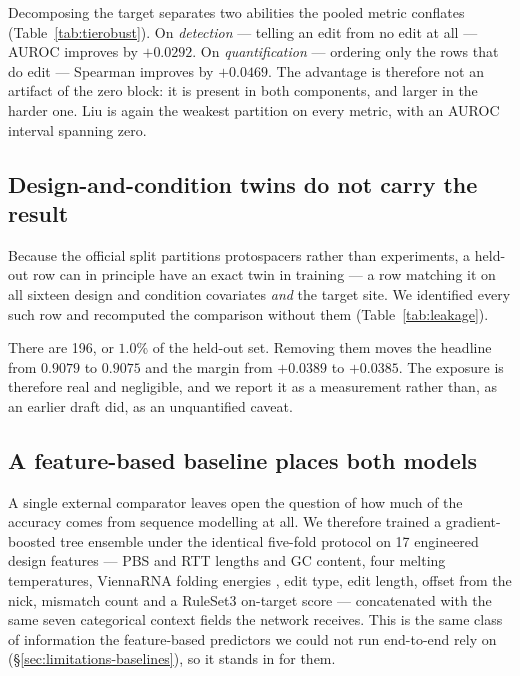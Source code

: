 \documentclass[11pt]{article}
\begin{document}
Decomposing the target separates two abilities the pooled metric conflates
(Table~\ref{tab:tierobust}). On \emph{detection} --- telling an edit from no edit at all
--- AUROC improves by $+0.0292$. On \emph{quantification} --- ordering only the rows that
do edit --- Spearman improves by $+0.0469$. The advantage is therefore not an artifact of
the zero block: it is present in both components, and larger in the harder one. Liu is
again the weakest partition on every metric, with an AUROC interval spanning zero.



\subsection{Design-and-condition twins do not carry the result}
\label{sec:leakage}

Because the official split partitions protospacers rather than experiments, a held-out
row can in principle have an exact twin in training --- a row matching it on all sixteen
design and condition covariates \emph{and} the target site. We identified every such row
and recomputed the comparison without them (Table~\ref{tab:leakage}).

There are 196, or $1.0\%$ of the held-out set. Removing them moves the headline from
$0.9079$ to $0.9075$ and the margin from $+0.0389$ to $+0.0385$. The exposure is
therefore real and negligible, and we report it as a measurement rather than, as an
earlier draft did, as an unquantified caveat.



\subsection{A feature-based baseline places both models}
\label{sec:gbm}

A single external comparator leaves open the question of how much of the accuracy comes
from sequence modelling at all. We therefore trained a gradient-boosted tree ensemble
under the identical five-fold protocol on 17 engineered design features --- PBS and RTT
lengths and GC content, four melting temperatures, ViennaRNA folding energies
\citep{lorenz2011}, edit type, edit length, offset from the nick, mismatch count and a
RuleSet3 on-target score \citep{doench2016} --- concatenated with the same seven
categorical context fields the network receives. This is the same class of information
the feature-based predictors we could not run end-to-end rely on
(\S\ref{sec:limitations-baselines}), so it stands in for them.
\end{document}
